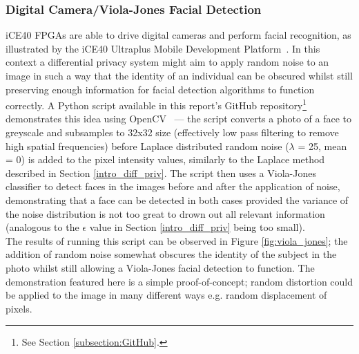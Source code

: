 \documentclass[12pt]{article}
\begin{document}
    \subsubsection{Digital Camera/Viola-Jones Facial Detection}
      iCE40 FPGAs are able to drive digital cameras and perform facial recognition, as illustrated by the iCE40 Ultraplus Mobile Development Platform~\cite{iCE40_MDP}. In this context a differential privacy system might aim to apply random noise to an image in such a way that the identity of an individual can be obscured whilst still preserving enough information for facial detection algorithms to function correctly.  A Python script available in this report's GitHub repository\footnote{See Section \ref{subsection:GitHub}.} demonstrates this idea using OpenCV~\cite{opencv-contrib-python} --- the script converts a photo of a face to greyscale and subsamples to 32x32 size (effectively low pass filtering to remove high spatial frequencies) before Laplace distributed random noise ($\lambda$ = 25, mean = 0) is added to the pixel intensity values, similarly to the Laplace method described in Section \ref{intro_diff_priv}. The script then uses a Viola-Jones~\cite{Viola01rapidobject} classifier to detect faces in the images before and after the application of noise, demonstrating that a face can be detected in both cases provided the variance of the noise distribution is not too great to drown out all relevant information (analogous to the $\epsilon$ value in Section \ref{intro_diff_priv} being too small).\\

      The results of running this script can be observed in Figure \ref{fig:viola_jones}; the addition of random noise somewhat obscures the identity of the subject in the photo whilst still allowing a Viola-Jones facial detection to function. The demonstration featured here is a simple proof-of-concept; random distortion could be applied to the image in many different ways e.g. random displacement of pixels.
\end{document}
